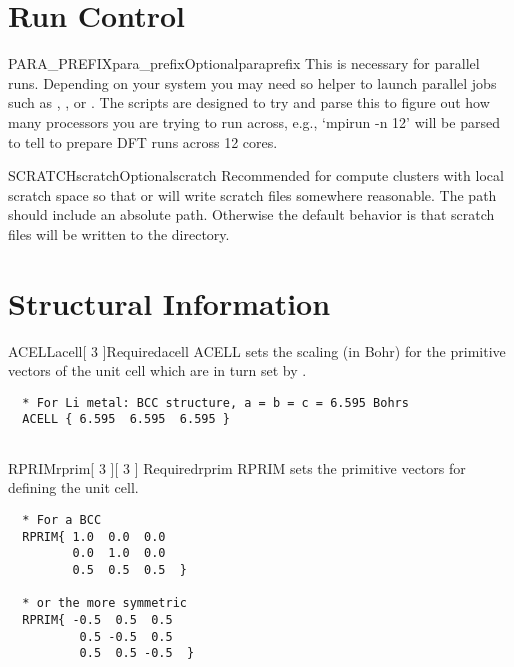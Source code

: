 \documentclass[11pt]{report}
\begin{document}
\section{Run Control}
\label{sec:Run-Control}

\begin{Card}{PARA\_PREFIX}{para\_prefix}{Optional}{paraprefix}
This is necessary for parallel runs. Depending on your system you may need so helper to launch parallel jobs such as , 
, or . The  scripts are designed to try and parse this to figure out how many processors 
you are trying to run across, e.g., `mpirun -n 12' will be parsed to tell  to prepare DFT runs across 12 cores. 
\end{Card}

\begin{Card}{SCRATCH}{scratch}{Optional}{scratch}
Recommended for compute clusters with local scratch space so that  or  
will write scratch files somewhere reasonable. The path  should include an absolute path. Otherwise the default 
behavior is that scratch files will be written to the  directory. 
\end{Card}



\section{Structural Information}
\label{sec:Structural-Information}



\begin{Card}{ACELL}{acell[ 3 ]}{Required}{acell}
  ACELL sets the scaling (in Bohr) for the primitive vectors of the unit cell which are in turn set by .

\begin{verbatim}
  * For Li metal: BCC structure, a = b = c = 6.595 Bohrs
  ACELL { 6.595  6.595  6.595 }
  
  \end{verbatim}
\end{Card}

\begin{Card}{RPRIM}{rprim[ 3 ][ 3 ] }{Required}{rprim}
  RPRIM sets the primitive vectors for defining the unit cell. 
  
  \begin{verbatim}
  * For a BCC
  RPRIM{ 1.0  0.0  0.0
         0.0  1.0  0.0
         0.5  0.5  0.5  }
  
  * or the more symmetric
  RPRIM{ -0.5  0.5  0.5
          0.5 -0.5  0.5
          0.5  0.5 -0.5  }
         
  \end{verbatim}
\end{Card}
\end{document}
